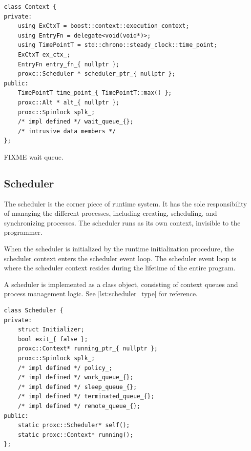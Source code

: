 \begin{lstfloat}
\begin{lstlisting}[caption={Minimal context type.}, label={lst:context_type}, style={CustomC++}, xleftmargin={2em}]
class Context {
private:
    using ExCtxT = boost::context::execution_context;
    using EntryFn = delegate<void(void*)>;
    using TimePointT = std::chrono::steady_clock::time_point;
    ExCtxT ex_ctx_;
    EntryFn entry_fn_{ nullptr };
    proxc::Scheduler * scheduler_ptr_{ nullptr };
public:
    TimePointT time_point_{ TimePointT::max() };
    proxc::Alt * alt_{ nullptr };
    proxc::Spinlock splk_;
    /* impl defined */ wait_queue_{};
    /* intrusive data members */
};
\end{lstlisting}
\end{lstfloat}

FIXME wait queue.


\subsection{Scheduler}
\label{subsec:scheduler_implementation}


The scheduler is the corner piece of runtime system. It has the sole responsibility of managing the different processes, including creating, scheduling, and synchronizing processes. The scheduler runs as its own context, invisible to the programmer.

When the scheduler is initialized by the runtime initialization procedure, the scheduler context enters the scheduler event loop. The scheduler event loop is where the scheduler context resides during the lifetime of the entire program.

A scheduler is implemented as a class object, consisting of context queues and process management logic. See \cref{lst:scheduler_type} for reference.

\begin{lstfloat}
\begin{lstlisting}[caption={Minimal scheduler type.}, label={lst:scheduler_type}, style={CustomC++}, xleftmargin={2em}]
class Scheduler {
private:
    struct Initializer;
    bool exit_{ false };
    proxc::Context* running_ptr_{ nullptr };
    proxc::Spinlock splk_;
    /* impl defined */ policy_;
    /* impl defined */ work_queue_{};
    /* impl defined */ sleep_queue_{};
    /* impl defined */ terminated_queue_{};
    /* impl defined */ remote_queue_{};
public:
    static proxc::Scheduler* self();
    static proxc::Context* running();
};
\end{lstlisting}
\end{lstfloat}


